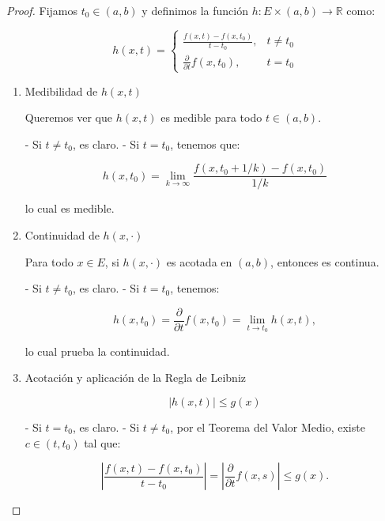 \begin{proof}
    Fijamos \( t_0 \in (a,b) \) y definimos la función \( h: E \times (a,b) \to \mathbb{R} \) como:

    \[
        h(x,t) =
        \begin{cases}
            \frac{f(x,t) - f(x,t_0)}{t - t_0},    & t \neq t_0 \\
            \frac{\partial}{\partial t} f(x,t_0), & t = t_0
        \end{cases}
    \]

    \begin{enumerate}

        \item Medibilidad de \( h(x,t) \)

              Queremos ver que \( h(x,t) \) es medible para todo \( t \in (a,b) \).

              - Si \( t \neq t_0 \), es claro.
              - Si \( t = t_0 \), tenemos que:

              \[
                  h(x,t_0) = \lim_{k \to \infty} \frac{f(x,t_0 + 1/k) - f(x,t_0)}{1/k}
              \]

              lo cual es medible.

        \item Continuidad de \( h(x, \cdot) \)

              Para todo \( x \in E \), si \( h(x, \cdot) \) es acotada en \( (a,b) \),
              entonces es continua.

              - Si \( t \neq t_0 \), es claro.
              - Si \( t = t_0 \), tenemos:

              \[
                  h(x,t_0) = \frac{\partial}{\partial t} f(x,t_0) = \lim_{t \to t_0} h(x,t),
              \]

              lo cual prueba la continuidad.

        \item Acotación y aplicación de la Regla de Leibniz

              \[
                  |h(x,t)| \leq g(x)
              \]

              - Si \( t = t_0 \), es claro.
              - Si \( t \neq t_0 \), por el Teorema del Valor Medio, existe \( c \in (t,t_0) \) tal que:

              \[
                  \left| \frac{f(x,t) - f(x,t_0)}{t - t_0} \right| = \left| \frac{\partial}{\partial t} f(x,s) \right| \leq g(x).
              \]


\end{enumerate}
\end{proof}
